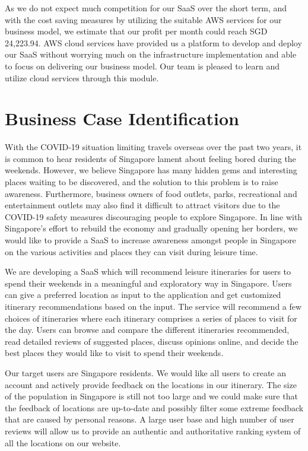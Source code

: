 \documentclass[12pt,a4paper]{article}
\begin{document}
As we do not expect much competition for our SaaS over the short term, and with the cost saving measures by utilizing the suitable AWS services for our business model, we estimate that our profit per month could reach SGD 24,223.94. AWS cloud services have provided us a platform to develop and deploy our SaaS without worrying much on the infrastructure implementation and able to focus on delivering our business model. Our team is pleased to learn and utilize cloud services through this module.



\section{Business Case Identification}

With the COVID-19 situation limiting travels overseas over the past two years, it is common to hear residents of Singapore lament about feeling bored during the weekends. However, we believe Singapore has many hidden gems and interesting places waiting to be discovered, and the solution to this problem is to raise awareness. Furthermore, business owners of food outlets, parks, recreational and entertainment outlets may also find it difficult to attract visitors due to the COVID-19 safety measures discouraging people to explore Singapore. In line with Singapore’s effort to rebuild the economy and gradually opening her borders, we would like to provide a SaaS to increase awareness amongst people in Singapore on the various activities and places they can visit during leisure time.

We are developing a SaaS which will recommend leisure itineraries for users to spend their weekends in a meaningful and exploratory way in Singapore. Users can give a preferred location as input to the application and get customized itinerary recommendations based on the input. The service will recommend a few choices of itineraries where each itinerary comprises a series of places to visit for the day. Users can browse and compare the different itineraries recommended, read detailed reviews of suggested places, discuss opinions online, and decide the best places they would like to visit to spend their weekends.

Our target users are Singapore residents. We would like all users to create an account and actively provide feedback on the locations in our itinerary. The size of the population in Singapore is still not too large and we could make sure that the feedback of locations are up-to-date and possibly filter some extreme feedback that are caused by personal reasons. A large user base and high number of user reviews will allow us to provide an authentic and authoritative ranking system of all the locations on our website. 
\end{document}

